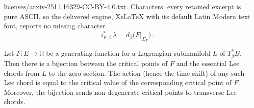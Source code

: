 \documentclass[10pt,a4paper]{amsart}
\begin{document}
licenses/arxiv-2511.16329-CC-BY-4.0.txt. Characters: every retained excerpt is pure ASCII, so the delivered engine, XeLaTeX with its default Latin Modern text font, reports no missing character.
\begin{equation}\label{equation: pullback of lambda}
i_{F, \beta}^{\ast} \, \lambda
= d_{\beta} \big( \left. F \right\lvert_{\Sigma_F} \big) \,.
\end{equation}

\begin{lemma}\label{lemma: bijection critical points F}
Let $F: E \rightarrow \mathbb{R}$ be a generating function
for a Lagrangian submanifold $L$ of $T_{\beta}^{\ast}B$.
Then there is a bijection between the critical points of $F$
and the essential Lee chords from $L$ to the zero section.
The action (hence the time-shift) of any such Lee chord
is equal to the critical value
of the corresponding critical point of $F$.
Moreover,
the bijection sends non-degenerate critical points
to transverse Lee chords.
\end{lemma}
\end{document}
